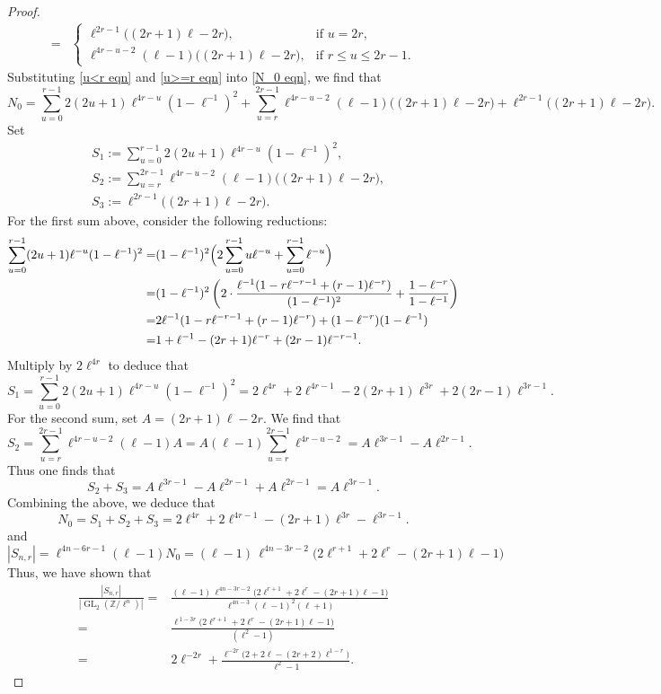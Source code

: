 \documentclass[table]{amsart}
\newcommand{\op}[1]{\operatorname{#1}}
\numberwithin{equation}{section}
\begin{document}
\begin{proof}
\begin{equation}
\begin{split}
=&\begin{cases}
\ell^{2r-1}\big((2r+1)\ell-2r\big), & \text{if }u=2r,\\
\ell^{4r-u-2}(\ell-1)\big((2r+1)\ell-2r\big), & \text{if }r\le u\le 2r-1.
\end{cases}
\end{split}
\end{equation}
Substituting \eqref{u<r eqn} and \eqref{u>=r eqn} into \eqref{N_0 eqn}, we find that
\[N_0=\sum_{u=0}^{r-1}2(2u+1) \ell^{4r-u}\left(1-\ell^{-1}\right)^2+\sum_{u=r}^{2r-1}\ell^{4r-u-2}(\ell-1)\big((2r+1)\ell-2r\big)+\ell^{2r-1}\big((2r+1)\ell-2r\big).\]
\noindent Set 
\[\begin{split}
&S_1:=\sum_{u=0}^{r-1}2(2u+1) \ell^{4r-u}\left(1-\ell^{-1}\right)^2,\\
&S_2:=\sum_{u=r}^{2r-1}\ell^{4r-u-2}(\ell-1)\big((2r+1)\ell-2r\big),\\
&S_3:=\ell^{2r-1}\big((2r+1)\ell-2r\big).
\end{split}\]
For the first sum above, consider the following reductions:
\[
\begin{split}\sum_{u=0}^{r-1} (2u+1)\ell^{-u}(1-\ell^{-1})^{2}
= &(1-\ell^{-1})^{2}\Bigl(2\sum_{u=0}^{r-1}u\ell^{-u}+\sum_{u=0}^{r-1}\ell^{-u}\Bigr)\\
= &(1-\ell^{-1})^{2}\left( 
2\cdot\frac{\ell^{-1}(1-r\ell^{-r-1}+(r-1)\ell^{-r})}{(1-\ell^{-1})^{2}}
+ \frac{1-\ell^{-r}}{1-\ell^{-1}}
\right)\\
= &2\ell^{-1}(1-r\ell^{-r-1}+(r-1)\ell^{-r}) + (1-\ell^{-r})(1-\ell^{-1})\\
= &1+\ell^{-1}-(2r+1)\ell^{-r}+(2r-1)\ell^{-r-1}.
\end{split}
\]
\noindent Multiply by $2 \ell^{4r}$ to deduce that
\[
S_1=\sum_{u=0}^{r-1}2(2u+1) \ell^{4r-u}\left(1-\ell^{-1}\right)^2= 2\ell^{4r} + 2\ell^{4r-1} - 2(2r+1)\ell^{3r} + 2(2r-1)\ell^{3r-1}.
\]
\noindent For the second sum, set $A = (2r+1)\ell - 2r$. We find that
\[
S_2=\sum_{u=r}^{2r-1} \ell^{4r-u-2} (\ell-1) A 
= A (\ell-1) \sum_{u=r}^{2r-1} \ell^{4r-u-2}=A \ell^{3r-1} - A \ell^{2r-1}.
\]
Thus one finds that
\[
S_2 + S_3 = A \ell^{3r-1} - A \ell^{2r-1} + A \ell^{2r-1} = A \ell^{3r-1}.
\]
Combining the above, we deduce that
\[
N_0= S_1 + S_2 + S_3 =  2\ell^{4r} + 2\ell^{4r-1} - (2r+1)\ell^{3r} - \ell^{3r-1}.
\]
and 
\[
|S_{n,r}| = \ell^{4n-6r-1}(\ell-1)N_0=(\ell-1)\, \ell^{4n-3r-2} \Big( 2 \ell^{r+1} + 2 \ell^r - (2r+1)\ell -1 \Big)
\]
Thus, we have shown that
\[\begin{split}
\frac{|S_{n,r}|}{|\op{GL}_2(\mathbb{Z}/\ell^n)|} 
=&\frac{(\ell-1)\,\ell^{4n-3r-2}\big(2\ell^{r+1}+2\ell^{r}-(2r+1)\ell-1\big)}
       {\ell^{4n-3}(\ell-1)^2(\ell+1)}\\
=&\frac{\ell^{\,1-3r}\big(2\ell^{r+1}+2\ell^{r}-(2r+1)\ell-1\big)}
       {(\ell^2-1)}\\
=&
2\ell^{-2r}
+
\frac{\ell^{-2r}\big(2+2\ell-(2r+2)\ell^{1-r}\big)}{\ell^{2}-1}.
\end{split}
\]
\end{proof}
\end{document}

